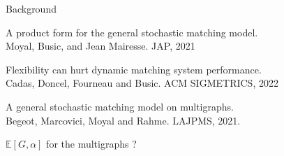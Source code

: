 \documentclass[12pt,aspectratio=1610]{beamer}
\begin{document}
\begin{frame}{Background}
\begin{fullpageitemize}
\item {\color{blue}A product form for the general stochastic matching model.\\ Moyal, Busic, and Jean Mairesse. JAP, 2021 }
\item {\color{red}Flexibility can hurt dynamic matching system performance.\\ Cadas, Doncel, Fourneau and Busic. ACM SIGMETRICS, 2022}
\item {\color{blue}A general stochastic matching model on multigraphs.\\ Begeot, Marcovici, Moyal and Rahme. LAJPMS, 2021.}
\item {\color{red}$\mathbb{E}[G,\alpha]$ for the multigraphs ?}
\end{fullpageitemize}
\end{frame}
\end{document}
